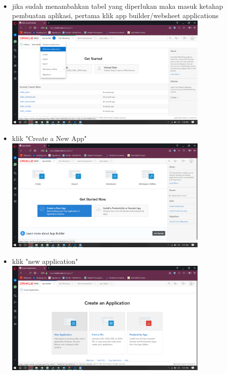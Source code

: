 \documentclass[a4paper,12pt]{report}
\begin{document}
\paragraph{}
\begin{itemize}

	\item jika sudah menambahkan tabel yang diperlukan maka masuk ketahap pembuatan aplikasi, pertama klik app builder/websheet applications\\
	\includegraphics[width=10cm]{aplikasi websheet/Screenshot (148).png}\\ 
	\item klik "Create a New App"\\
	\includegraphics[width=10cm]{aplikasi websheet/Screenshot (149).png}\\ 
	\item klik "new application"\\
	\includegraphics[width=10cm]{aplikasi websheet/Screenshot (150).png}\\ 

\end{itemize}
\end{document}
